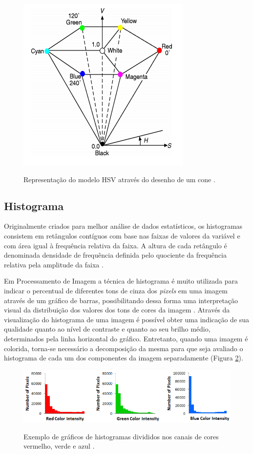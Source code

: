 \begin{figure}[H]
    \centering
    {\includegraphics[scale=0.5]{figuras/modelo_hsv}}
    \caption{Representação do modelo HSV através do desenho de um cone \cite{MOTTA}.}
    \label{img:modelo_hsv}
\end{figure}

\subsection{Histograma}

Originalmente criados para melhor análise de dados estatísticos, os histogramas consistem em retângulos contíguos com base nas faixas de valores da variável e com área igual à frequência relativa da faixa. A altura de cada retângulo é denominada densidade de frequência definida pelo quociente da frequência relativa pela amplitude da faixa \cite{CECIRE}.

Em Processamento de Imagem a técnica de histograma é muito utilizada para indicar o percentual de diferentes tons de cinza dos \textit{pixels} em uma imagem através de um gráfico de barras, possibilitando dessa forma uma interpretação visual da distribuição dos valores dos tons de cores da imagem \cite{OGE}. Através da visualização do histograma de uma imagem é possível obter uma indicação de sua qualidade quanto ao nível de contraste e quanto ao seu brilho médio, determinados pela linha horizontal do gráfico. Entretanto, quando uma imagem é colorida, torna-se necessário a decomposição da mesma para que seja avaliado o histograma de cada um dos componentes da imagem separadamente (Figura \ref{img:ex_histograma}).

\begin{figure}[h]
    \centering
    {\includegraphics[scale=0.75]{figuras/ex_histograma}}
    \caption{Exemplo de gráficos de histogramas divididos nos canais de cores vermelho, verde e azul \cite{CLOUD}.}
    \label{img:ex_histograma}
\end{figure}

